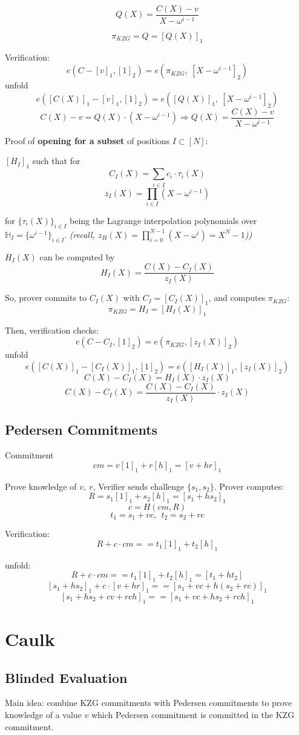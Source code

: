 \documentclass{article}
\theoremstyle{definition}
\begin{document}
$$Q(X) = \frac{C(X) - v}{X-\omega^{i-1}}$$

$$\pi_{KZG} = Q =[Q(X)]_1$$

Verification:
$$e(C - [v]_1, [1]_2) = e(\pi_{KZG},~[X-\omega^{i-1}]_2)$$
unfold
$$e([C(X)]_1 - [v]_1, [1]_2) = e([Q(X)]_1,~[X-\omega^{i-1}]_2)$$
$$C(X) - v = Q(X) \cdot (X-\omega^{i-1}) \Longrightarrow Q(X) = \frac{C(X) - v}{X-\omega^{i-1}}$$


Proof of \textbf{opening for a subset} of positions $I \subset [N]$:

$[H_I]_1$ such that for
$$C_I(X) = \sum_{i \in I} c_i \cdot \tau_i(X)$$
$$z_I(X) = \prod_{i \in I} (X - \omega^{i-1})$$

for $\{ \tau_i(X) \}_{i \in I}$ being the Lagrange interpolation polynomials over $\mathbb{H}_I = \{\omega^{i-1}\}_{i \in I}$.
\emph{(recall, $z_H(X)=\prod_{i=0}^{N-1} (X - \omega^i) = X^N -1$))}


$H_I(X)$ can be computed by
$$H_I(X) = \frac{C(X) - C_I(X)}{z_I(X)}$$

So, prover commits to $C_I(X)$ with $C_I = [C_I(X)]_1$, and computes $\pi_{KZG}$:
$$\pi_{KZG} = H_I = [H_I(X)]_1$$

Then, verification checks:
$$e(C - C_I, [1]_2) = e(\pi_{KZG}, [z_I(X)]_2)$$
unfold
$$e([C(X)]_1 - [C_I(X)]_1, [1]_2) = e([H_I(X)]_1, [z_I(X)]_2)$$
$$C(X) - C_I(X) = H_I(X) \cdot z_I(X)$$
$$C(X) - C_I(X) = \frac{C(X)-C_I(X)}{z_I(X)} \cdot z_I(X)$$



\subsection{Pedersen Commitments}\label{sec:pedersen}
Commitment
$$cm = v [1]_1 + r [h]_1 = [v + hr]_1$$

Prove knowledge of $v,~r$, Verifier sends challenge $\{s_1, s_2\}$. Prover computes:
$$R = s_1 [1]_1 + s_2 [h]_1 = [s_1 + h s_2]_1$$
$$c= H(cm, R)$$
$$t_1 = s_1 + v c, ~~ t_2=s_2 + r c$$

Verification:
$$R + c \cdot cm == t_1 [1]_1 + t_2 [h]_1$$

unfold:
$$R + c \cdot cm == t_1 [1]_1 + t_2 [h]_1 = [t_1 + h t_2]$$
$$[s_1 + h s_2]_1 + c \cdot [v + hr]_1 == [s_1 + vc + h(s_2 + rc)]_1$$
$$[s_1 + h s_2 + cv + rch]_1 == [s_1 + vc + h s_2 + rch]_1$$


\section{Caulk}
\subsection{Blinded Evaluation}
Main idea: combine KZG commitments with Pedersen commitments to prove knowledge of a value $v$ which Pedersen commitment is committed in the KZG commitment.
\end{document}
